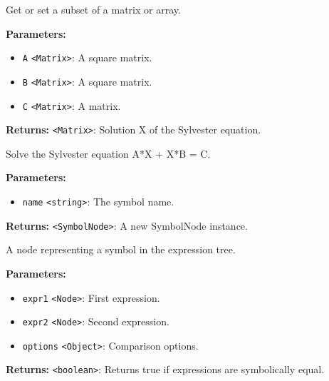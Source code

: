 \documentclass[12pt,a4paper]{article}
\begin{document}
\noindent Get or set a subset of a matrix or array.

\vspace{5mm}
\noindent {}


\noindent \textbf{Parameters:}
\begin{itemize}
  \item \texttt{A} \texttt{<Matrix>}: A square matrix.
  \item \texttt{B} \texttt{<Matrix>}: A square matrix.
  \item \texttt{C} \texttt{<Matrix>}: A matrix.
\end{itemize}

\noindent \textbf{Returns:} \texttt{<Matrix>}: Solution X of the Sylvester equation.

\noindent Solve the Sylvester equation A*X + X*B = C.

\vspace{5mm}
\noindent {}


\noindent \textbf{Parameters:}
\begin{itemize}
  \item \texttt{name} \texttt{<string>}: The symbol name.
\end{itemize}

\noindent \textbf{Returns:} \texttt{<SymbolNode>}: A new SymbolNode instance.

\noindent A node representing a symbol in the expression tree.

\vspace{5mm}
\noindent {}


\noindent \textbf{Parameters:}
\begin{itemize}
  \item \texttt{expr1} \texttt{<Node>}: First expression.
  \item \texttt{expr2} \texttt{<Node>}: Second expression.
  \item \texttt{options} \texttt{<Object>}: Comparison options.
\end{itemize}

\noindent \textbf{Returns:} \texttt{<boolean>}: Returns true if expressions are symbolically equal.
\end{document}
